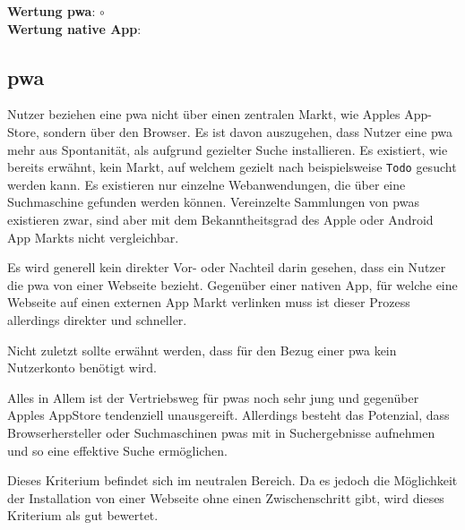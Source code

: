 \textbf{Wertung \ac{pwa}}:  $\circ$\\
\textbf{Wertung native App}:  \\



\subsection{\ac{pwa}}
Nutzer beziehen eine \ac{pwa} nicht über einen zentralen Markt, wie Apples App-Store, sondern über den Browser. Es ist davon auszugehen, dass Nutzer eine \ac{pwa} mehr aus Spontanität, als aufgrund gezielter Suche installieren. Es existiert, wie bereits erwähnt, kein Markt, auf welchem gezielt nach beispielsweise \texttt{Todo} gesucht werden kann. Es existieren nur einzelne Webanwendungen, die über eine Suchmaschine gefunden werden können. Vereinzelte Sammlungen von \ac{pwa}s existieren zwar, sind aber mit dem Bekanntheitsgrad des Apple oder Android App Markts nicht vergleichbar.

Es wird generell kein direkter Vor- oder Nachteil darin gesehen, dass ein Nutzer die \ac{pwa} von einer Webseite bezieht. Gegenüber einer nativen App, für welche eine Webseite auf einen externen App Markt verlinken muss ist dieser Prozess allerdings direkter und schneller.

Nicht zuletzt sollte erwähnt werden, dass für den Bezug einer \ac{pwa} kein Nutzerkonto benötigt wird.

Alles in Allem ist der Vertriebsweg für \ac{pwa}s noch sehr jung und gegenüber Apples AppStore tendenziell unausgereift. Allerdings besteht das Potenzial, dass Browserhersteller oder Suchmaschinen \ac{pwa}s mit in Suchergebnisse aufnehmen und so eine effektive Suche ermöglichen.

Dieses Kriterium befindet sich im neutralen Bereich. Da es jedoch die Möglichkeit der Installation von einer Webseite ohne einen Zwischenschritt gibt, wird dieses Kriterium als gut bewertet.